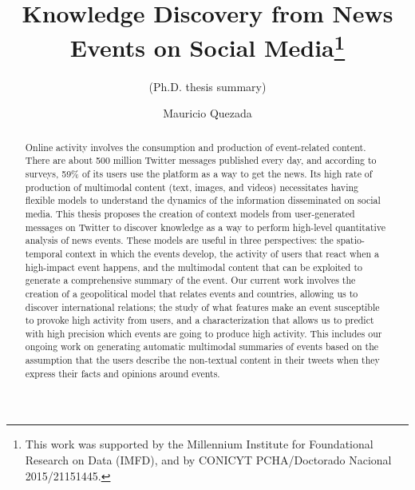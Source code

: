 \documentclass[runningheads]{llncs}
\begin{document}
%
\title{Knowledge Discovery from News Events on Social Media\thanks{This work was
supported by the Millennium Institute for Foundational Research on Data (IMFD),
and by CONICYT PCHA/Doctorado Nacional 2015/21151445.}}
\subtitle{(Ph.D. thesis summary)}
%
%
\author{Mauricio Quezada}
%
%
%
\maketitle              %
%
\begin{abstract}
    Online activity involves the consumption and production of event-related
    content. 
    There are about 500 million Twitter messages published every day, and
    according to surveys, 59\% of its users use the platform as a way to get the
    news. 
    Its high rate of production of multimodal content (text, images, and videos)
    necessitates having flexible models to understand the dynamics of
    the information disseminated on social media. 
    This thesis proposes the creation of context models from user-generated
    messages on Twitter to discover knowledge as a way to perform high-level
    quantitative analysis of news events. 
    These models are useful in three perspectives: the
    spatio-temporal context in which the events develop, the activity of users
    that react when a high-impact event happens, and the multimodal content that
    can be exploited to generate a comprehensive summary of the event. 
    Our current work involves the creation of a geopolitical model that relates
    events and countries, allowing us to discover international relations; 
    the study of what features make an event susceptible to provoke high
    activity from users, and a characterization that allows us to predict with
    high precision which events are going to produce high activity. 
    This includes our ongoing work on generating automatic multimodal summaries
    of events based on the assumption that the users describe the non-textual
    content in their tweets when they express their facts and opinions around
    events.

\end{abstract}
\end{document}
